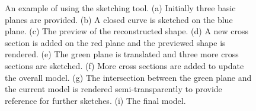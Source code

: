 \begin{figure} [htbp]
  \caption{An example of using the sketching tool. 
  (a) Initially three basic planes are provided. 
  (b) A closed curve is sketched on the blue plane. 
  (c) The preview of the reconstructed shape. 
  (d) A new cross section is added on the red plane and the previewed shape is rendered. 
  (e) The green plane is translated and three more cross sections are sketched. 
  (f) More cross sections are added to update the overall model. 
  (g) The intersection between the green plane and the current model is rendered semi-transparently
  to provide reference for further sketches. 
  (i) The final model.}
  \label{fig:pig} %
\end{figure}

